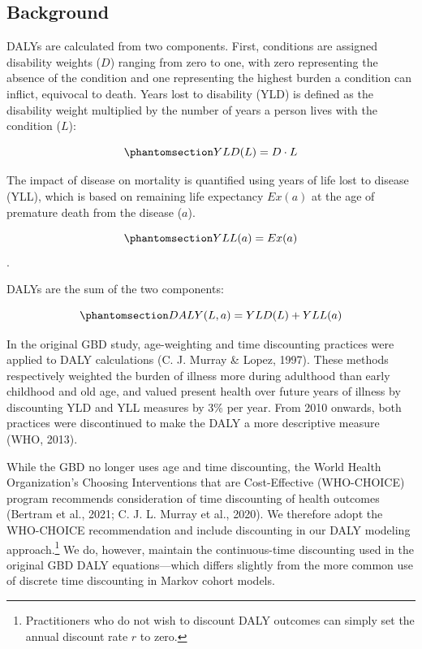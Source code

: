 \documentclass[
]{agujournal2019}
\begin{document}
\subsection{Background}\label{sec-background}

DALYs are calculated from two components. First, conditions are assigned
disability weights (\(D\)) ranging from zero to one, with zero
representing the absence of the condition and one representing the
highest burden a condition can inflict, equivocal to death. Years lost
to disability (YLD) is defined as the disability weight multiplied by
the number of years a person lives with the condition (\(L\)):

\begin{equation}\phantomsection\label{eq-yld1}{
YLD(L) = D \cdot L
}\end{equation}

The impact of disease on mortality is quantified using years of life
lost to disease (YLL), which is based on remaining life expectancy
\(Ex(a)\) at the age of premature death from the disease (\(a\)).

\begin{equation}\phantomsection\label{eq-yll1}{
YLL(a)= Ex(a)
}\end{equation} .

DALYs are the sum of the two components:

\begin{equation}\phantomsection\label{eq-daly}{
DALY(L,a) = YLD(L) + YLL(a)
}\end{equation}

In the original GBD study, age-weighting and time discounting practices
were applied to DALY calculations (C. J. Murray \& Lopez, 1997). These
methods respectively weighted the burden of illness more during
adulthood than early childhood and old age, and valued present health
over future years of illness by discounting YLD and YLL measures by 3\%
per year. From 2010 onwards, both practices were discontinued to make
the DALY a more descriptive measure (WHO, 2013).

While the GBD no longer uses age and time discounting, the World Health
Organization's Choosing Interventions that are Cost-Effective
(WHO-CHOICE) program recommends consideration of time discounting of
health outcomes (Bertram et al., 2021; C. J. L. Murray et al., 2020). We
therefore adopt the WHO-CHOICE recommendation and include discounting in
our DALY modeling approach.\footnote{Practitioners who do not wish to
  discount DALY outcomes can simply set the annual discount rate \(r\)
  to zero.} We do, however, maintain the continuous-time discounting
used in the original GBD DALY equations---which differs slightly from
the more common use of discrete time discounting in Markov cohort
models.
\end{document}
